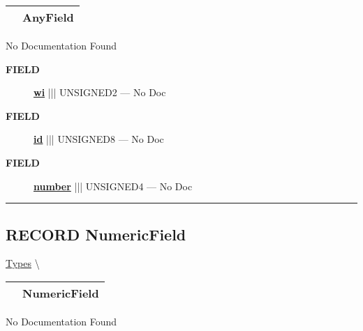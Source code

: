 {\renewcommand{\arraystretch}{1.5}
\begin{tabularx}{\textwidth}{|>{\raggedright\arraybackslash}l|X|}
\hline
\hspace{0pt}\mytexttt{\color{red} } & \textbf{AnyField} \\
\hline
\end{tabularx}
}

\par





No Documentation Found







\par
\begin{description}
\item [\colorbox{tagtype}{\color{white} \textbf{\textsf{FIELD}}}] \textbf{\underline{wi}} ||| UNSIGNED2 --- No Doc
\item [\colorbox{tagtype}{\color{white} \textbf{\textsf{FIELD}}}] \textbf{\underline{id}} ||| UNSIGNED8 --- No Doc
\item [\colorbox{tagtype}{\color{white} \textbf{\textsf{FIELD}}}] \textbf{\underline{number}} ||| UNSIGNED4 --- No Doc
\end{description}





\rule{\linewidth}{0.5pt}
\subsection*{\textsf{\colorbox{headtoc}{\color{white} RECORD}
NumericField}}

\hypertarget{ecldoc:ml_core.types.numericfield}{}
\hspace{0pt} \hyperlink{ecldoc:ML_Core.Types}{Types} \textbackslash 

{\renewcommand{\arraystretch}{1.5}
\begin{tabularx}{\textwidth}{|>{\raggedright\arraybackslash}l|X|}
\hline
\hspace{0pt}\mytexttt{\color{red} } & \textbf{NumericField} \\
\hline
\end{tabularx}
}

\par





No Documentation Found







